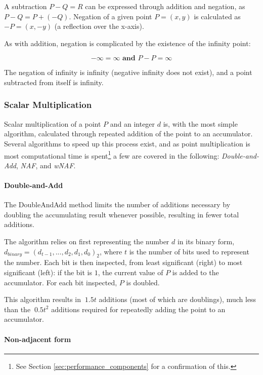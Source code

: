 A subtraction \(P - Q = R\) can be expressed through addition and negation, as \(P - Q = P + (-Q)\). Negation of a given point
\(P = (x,y)\) is calculated as \(-P = (x,-y)\) (a reflection over the x-axis).

As with addition, negation is complicated by the existence of the infinity point:

\begin{equation}
	-\infty = \infty \textbf{ and } P - P = \infty
\end{equation}

The negation of infinity is infinity (negative infinity does not exist), and a point subtracted from itself is infinity.\cite{hankerson2010}

\subsubsection{Scalar Multiplication}

Scalar multiplication of a point \(P\) and an integer \(d\) is, with the most simple algorithm, calculated through repeated addition
of the point to an accumulator. Several algorithms to speed up this process exist, and as point multiplication is most computational
time is spent\footnote{See Section \ref{sec:performance_components} for a confirmation of this.} a few are covered in the following:
\emph{Double-and-Add}, \emph{NAF}, and \emph{wNAF}.

\paragraph{Double-and-Add}

The DoubleAndAdd method limits the number of additions necessary by doubling the accumulating result whenever possible, resulting in
fewer total additions.

The algorithm relies on first representing the number \(d\) in its binary form, \(d_{binary} = (d_{t-1}, ... , d_2, d_1, d_0)_2\),
where \(t\) is the number of bits used to represent the number. Each bit is then inspected, from least significant (right) to most
significant (left): if the bit is \(1\), the current value of \(P\) is added to the accumulator. For each bit inspected, \(P\) is
doubled.\cite{hankerson2010}

This algorithm results in \(~1.5t\) additions (most of which are doublings), much less than the \(~0.5t^2\) additions required for
repeatedly adding the point to an accumulator.

\paragraph{Non-adjacent form}

